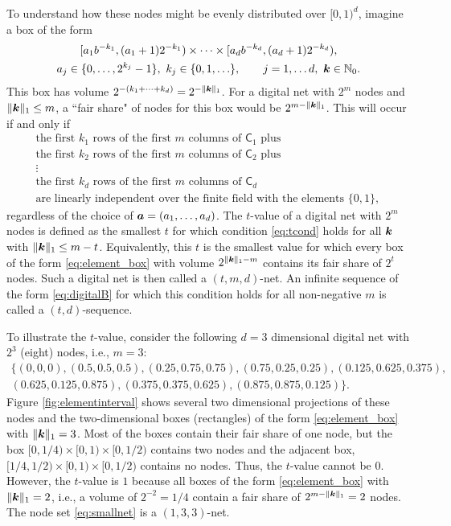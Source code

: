 \documentclass{svproc}
\begin{document}
To understand how these nodes might be evenly distributed over $[0,1)^d$, imagine a box of the form
\begin{multline} \label{eq:element_box}
	[a_1 b^{-k_1}, (a_1 + 1) 2^{-k_1}) \times \cdots \times [a_d b^{-k_d}, (a_d + 1) 2^{-k_d}), \\
	a_j \in \{0, \ldots, 2^{k_j} - 1\}, \ k_j \in \{0,1, \ldots \}, \qquad j =1, \ldots d, \ {\boldsymbol{k}} \in {\mathbb{N}}_0.
\end{multline}
This box has volume $2^{-(k_1 + \cdots +k_d)} = 2^{-\lVert{\boldsymbol{k}}\rVert_1}$.  For a digital net with $2^m$ nodes and $\lVert {\boldsymbol{k}} \rVert_1 \le m$, a ``fair share" of nodes for this box would be $2^{m- \lVert {\boldsymbol{k}} \rVert_1}$.  This will occur if and only if
\begin{multline} \label{eq:tcond}
	\text{the first $k_1$ rows of the first $m$ columns of $\mathsf{C}_1$ plus} \\
	\text{the first $k_2$ rows of the first $m$ columns of $\mathsf{C}_2$ plus} \\
	 \vdots \\
	\text{the first $k_d$ rows of the first $m$ columns of $\mathsf{C}_d$} \\
	\text{are linearly independent over the finite field with the elements $\{0,1\}$, }
\end{multline}
regardless of the choice of ${\boldsymbol{a}} = (a_1, \ldots, a_d)$.  The $t$-value of a digital net with $2^m$ nodes is defined as the smallest $t$ for which condition \eqref{eq:tcond} holds for all ${\boldsymbol{k}}$ with $\lVert {\boldsymbol{k}} \rVert_1 \le m-t$.  Equivalently, this $t$ is the smallest value for which every box of the form \eqref{eq:element_box} with volume $2^{\lVert {\boldsymbol{k}} \rVert_1 - m}$ contains its fair share of $2^t$ nodes.  Such a digital net is then called a $(t,m,d)$-net.  An infinite sequence of the form \eqref{eq:digitalB} for which this condition holds for all non-negative $m$ is called a  $(t,d)$-sequence.

To illustrate the $t$-value, consider the following $d=3$ dimensional digital net with $2^3$ (eight) nodes, i.e., $m = 3$:
\begin{multline} \label{eq:smallnet}
	\{(0, 0,   0),
	(0.5,   0.5,   0.5  ),
	(0.25,  0.75,  0.75 ),
	(0.75,  0.25,  0.25 ),
	(0.125, 0.625, 0.375),\\
	(0.625, 0.125, 0.875),
	(0.375, 0.375, 0.625),
	(0.875, 0.875, 0.125)\}.
\end{multline}
Figure \ref{fig:elementinterval} shows several two dimensional projections of these nodes and the two-dimensional boxes (rectangles) of the form \eqref{eq:element_box} with $\lVert{\boldsymbol{k}}\rVert_1 = 3$.  Most of the boxes contain their fair share of one node, but the box $[0,1/4) \times [0,1) \times [0,1/2)$ contains two nodes and the adjacent box, $[1/4,1/2) \times [0,1) \times [0,1/2)$ contains no nodes.  Thus, the $t$-value cannot be $0$.  However, the $t$-value is $1$ because all boxes of the form  \eqref{eq:element_box} with $\lVert{\boldsymbol{k}}\rVert_1 = 2$, i.e., a volume of $2^{-2} = 1/4$ contain a fair share of $2^{m- \lVert {\boldsymbol{k}} \rVert_1} = 2$ nodes.  The node set \eqref{eq:smallnet} is a $(1,3,3)$-net.
\end{document}

